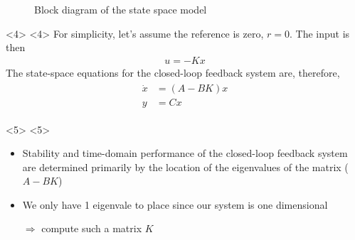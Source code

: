 \begin{frame}
\begin{onlyenv}
\begin{figure}[h]
{}
	\caption{Block diagram of the state space model}
	\label{fig:gain-schedule}
\end{figure}
\end{onlyenv}

\begin{onlyenv}<4>
<4>
	For simplicity, let's assume the reference is zero, $r = 0$. The input is then
	\begin{align*}
	u = - K x
	\end{align*}
	The state-space equations for the closed-loop feedback system are, therefore,
	\begin{align}
	\begin{split}
	\dot{x} &= (A-BK) x\\
	y &= C x
	\end{split}\label{eq:systemX}
	\end{align}
\end{onlyenv}


\begin{onlyenv}<5>
<5>
	\begin{itemize}
		\item Stability and time-domain performance of the closed-loop feedback system are determined primarily by the location of the eigenvalues of the matrix ($A-BK$)
		\item We only have 1 eigenvale to place since our system is one dimensional
		\item[$\Rightarrow$] compute such a matrix $K$
	\end{itemize}
\end{onlyenv}


\end{frame}
